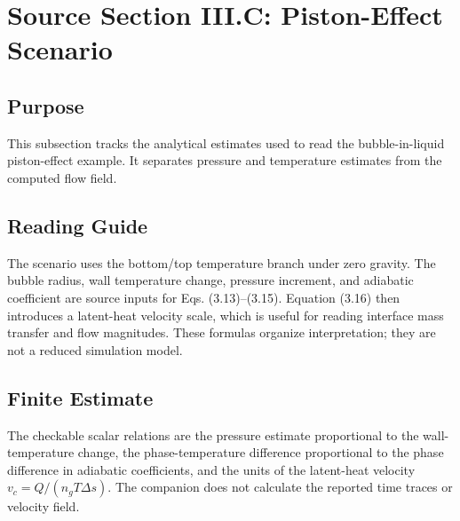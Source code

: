 \section{Source Section III.C: Piston-Effect Scenario}
\label{sec:piston-effect}


\subsection*{Purpose}

This subsection tracks the analytical estimates used to read the bubble-in-liquid
piston-effect example.  It separates pressure and temperature estimates from the
computed flow field.

\subsection*{Reading Guide}

The scenario uses the bottom/top temperature branch under zero gravity.  The
bubble radius, wall temperature change, pressure increment, and adiabatic
coefficient are source inputs for Eqs. (3.13)--(3.15).  Equation (3.16) then
introduces a latent-heat velocity scale, which is useful for reading interface
mass transfer and flow magnitudes.  These formulas organize interpretation; they
are not a reduced simulation model.

\subsection*{Finite Estimate}

The checkable scalar relations are the pressure estimate proportional to the
wall-temperature change, the phase-temperature difference proportional to the
phase difference in adiabatic coefficients, and the units of the latent-heat
velocity \(v_c=Q/(n_gT\Delta s)\).  The companion does not calculate the
reported time traces or velocity field.

